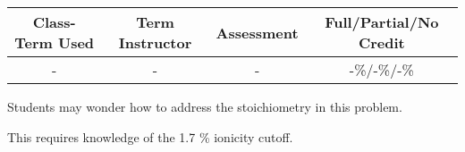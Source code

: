 \begin{outcomes}
\begin{center}
	\begin{tabular}{cccc}
		\hline\hline
		Class-Term Used & Term Instructor & Assessment & Full/Partial/No Credit \\
		\hline
		- & - & - & -\%/-\%/-\%\\    %
		\hline
	\end{tabular}
\end{center}
\end{outcomes}
\begin{comments}

Students may wonder how to address the stoichiometry in this problem.

This requires knowledge of the 1.7 \% ionicity cutoff.

	
\end{comments}